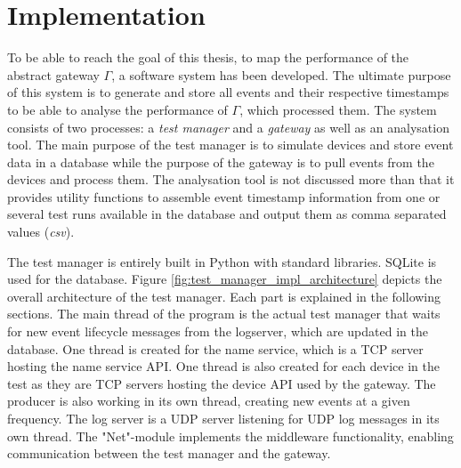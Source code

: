\chapter{Implementation}
\label{ch:implementation}

To be able to reach the goal of this thesis, to map the performance of the
abstract gateway $\Gamma$, a software system has been developed. The ultimate
purpose of this system is to generate and store all events and their respective
timestamps to be able to analyse the performance of $\Gamma$, which processed
them. The system consists of two processes: a \textit{test manager} and a
\textit{gateway} as well as an analysation tool. The main purpose of the test
manager is to simulate devices and store event data in a database while the
purpose of the gateway is to pull events from the devices and process them. The
analysation tool is not discussed more than that it provides utility functions
to assemble event timestamp information from one or several test runs available
in the database and output them as comma separated values (\textit{csv}).

The test manager is entirely built in Python with standard libraries. SQLite is
used for the database. Figure \ref{fig:test_manager_impl_architecture} depicts
the overall architecture of the test manager. Each part is explained in the
following sections. The main thread of the program is the actual test manager
that waits for new event lifecycle messages from the logserver, which are
updated in the database. One thread is created for the name service, which is a
TCP server hosting the name service API. One thread is also created for each
device in the test as they are TCP servers hosting the device API used by the
gateway. The producer is also working in its own thread, creating new events at
a given frequency. The log server is a UDP server listening for UDP log
messages in its own thread. The "Net"-module implements the middleware
functionality, enabling communication between the test manager and the gateway.

